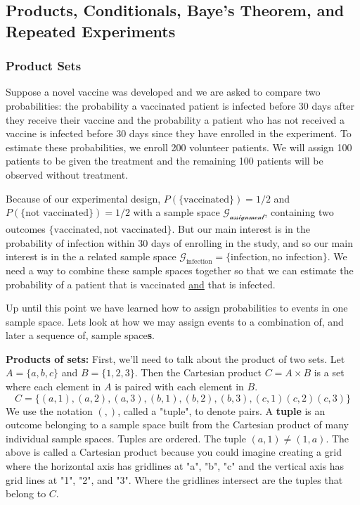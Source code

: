 \subsection{Products, Conditionals, Baye's Theorem, and Repeated Experiments }
\hspace{1mm}

\subsubsection{Product Sets}

Suppose a novel vaccine was developed and we are asked to compare two probabilities: the probability a vaccinated patient is infected before 30 days after they receive their vaccine and the probability a patient who has not received a vaccine is infected before 30 days since they have enrolled in the experiment. 
To estimate these probabilities, we enroll 200 volunteer patients. We will assign 100 patients to be given the treatment and the remaining 100 patients will be observed without treatment.

Because of our experimental design, $P(\{\text{vaccinated}\})=1/2$ and $P(\{\text{not vaccinated}\}) = 1/2$ with a sample space $\mathcal{G_{\text{assignment}}}$, containing two outcomes $\{\text{vaccinated},\text{not vaccinated}\}$.
But our main interest is in the probability of infection within 30 days of enrolling in the study, and so our main interest is in the a related sample space $\mathcal{G}_{\text{infection}} = \{\text{infection}, \text{no infection}\}$.
We need a way to combine these sample spaces together so that we can estimate the probability of a patient that is vaccinated \underline{and} that is infected. 

Up until this point we have learned how to assign probabilities to events in one sample space. 
Lets look at how we may assign events to a combination of, and later a sequence of, sample space\textbf{s}.

\textbf{Products of sets:}   
First, we'll need to talk about the product of two sets. 
Let $A = \{a,b,c\}$ and $B = \{1,2,3\}$. 
Then the Cartesian product $C = A \times B$ is a set where each element in $A$ is paired with each element in $B$. 
\begin{equation}
    C = \{(a,1),(a,2),(a,3),(b,1),(b,2),(b,3),(c,1)(c,2)(c,3)  \}
\end{equation}
We use the notation $(,)$, called a "tuple", to denote pairs.
A \textbf{tuple} is an outcome belonging to a sample space built from the Cartesian product of many individual sample spaces. 
Tuples are ordered. The tuple $(a,1) \neq (1,a)$.
The above is called a Cartesian product because you could imagine creating a grid where the horizontal axis has gridlines at "a", "b", "c" and the vertical axis has grid lines at "1", "2", and "3". Where the gridlines intersect are the tuples that belong to $C$.

